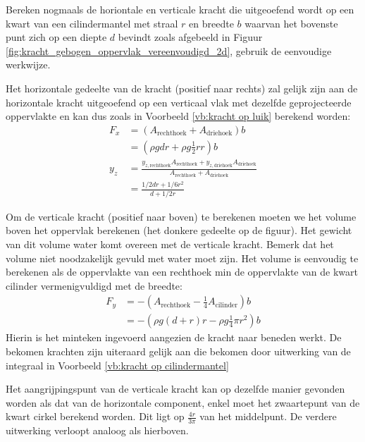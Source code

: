 \begin{voorbeeld}
	\label{vb:kracht op cilindermantel vereenvoudigd}
	Bereken nogmaals de horiontale en verticale kracht die uitgeoefend wordt op een kwart van een cilindermantel met straal $r$ en breedte $b$ waarvan het bovenste punt zich op een diepte $d$ bevindt zoals afgebeeld in Figuur \ref{fig:kracht_gebogen_oppervlak_vereenvoudigd_2d}, gebruik de eenvoudige werkwijze.

	Het horizontale gedeelte van de kracht (positief naar rechts) zal gelijk zijn aan de horizontale kracht uitgeoefend op een verticaal vlak met dezelfde geprojecteerde oppervlakte en kan dus zoals in Voorbeeld \ref{vb:kracht op luik} berekend worden:
	\begin{align*}
		F_x &= \left( A_{\text{rechthoek}} + A_{\text{driehoek}} \right) b\\
		    &= \left(\rho g  d r + \rho g \frac{1}{2} r r \right) b \\
		y_z &= \frac{ y_{z,\text{rechthoek}} A_{\text{rechthoek}} + y_{z,\text{driehoek}} A_{\text{driehoek}}}{A_{\text{rechthoek}} + A_{\text{driehoek}}} \\
		    &= \frac{ 1/2 d r + 1/6 r^2}{d + 1/2 r}
	\end{align*}

	Om de verticale kracht (positief naar boven) te berekenen moeten we het volume boven het oppervlak berekenen (het donkere gedeelte op de figuur). Het gewicht van dit volume water komt overeen met de verticale kracht. Bemerk dat het volume niet noodzakelijk gevuld met water moet zijn. Het volume is eenvoudig te berekenen als de oppervlakte van een rechthoek min de oppervlakte van de kwart cilinder vermenigvuldigd met de breedte:
	\begin{align*}
		F_y &= -(A_{\text{rechthoek}} - \frac{1}{4}A_{\text{cilinder}}) b\\
		    &= -\left( \rho g (d+r)r - \rho g \frac{1}{4} \pi r^2 \right) b
	\end{align*}
	Hierin is het minteken ingevoerd aangezien de kracht naar beneden werkt. De bekomen krachten zijn uiteraard gelijk aan die bekomen door uitwerking van de integraal in Voorbeeld \ref{vb:kracht op cilindermantel}

	Het aangrijpingspunt van de verticale kracht kan op dezelfde manier gevonden worden als dat van de horizontale component, enkel moet het zwaartepunt van de kwart cirkel berekend worden. Dit ligt op $\frac{4r}{3\pi}$ van het middelpunt. De verdere uitwerking verloopt analoog als hierboven.
\end{voorbeeld}

